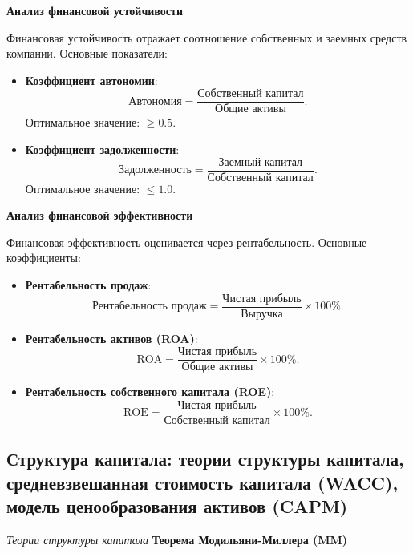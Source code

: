 \textbf{Анализ финансовой устойчивости}

Финансовая устойчивость отражает соотношение собственных и заемных средств компании. Основные показатели:
\begin{itemize}
    \item \textbf{Коэффициент автономии}:
    \begin{equation}
        \text{Автономия} = \frac{\text{Собственный капитал}}{\text{Общие активы}}.
    \end{equation}
    Оптимальное значение: $\geq 0.5$.
    \item \textbf{Коэффициент задолженности}:
    \begin{equation}
        \text{Задолженность} = \frac{\text{Заемный капитал}}{\text{Собственный капитал}}.
    \end{equation}
    Оптимальное значение: $\leq 1.0$.
\end{itemize}

\textbf{Анализ финансовой эффективности}

Финансовая эффективность оценивается через рентабельность. Основные коэффициенты:
\begin{itemize}
    \item \textbf{Рентабельность продаж}:
    \begin{equation}
        \text{Рентабельность продаж} = \frac{\text{Чистая прибыль}}{\text{Выручка}} \times 100\%.
    \end{equation}
    \item \textbf{Рентабельность активов (ROA)}:
    \begin{equation}
        \text{ROA} = \frac{\text{Чистая прибыль}}{\text{Общие активы}} \times 100\%.
    \end{equation}
    \item \textbf{Рентабельность собственного капитала (ROE)}:
    \begin{equation}
        \text{ROE} = \frac{\text{Чистая прибыль}}{\text{Собственный капитал}} \times 100\%.
    \end{equation}
\end{itemize}

\pagebreak
\subsection{Структура капитала: теории структуры капитала, средневзвешанная стоимость капитала (WACC), модель ценообразования активов (CAPM)}

\textit{Теории структуры капитала}
\textbf{Теорема Модильяни-Миллера (MM)}

